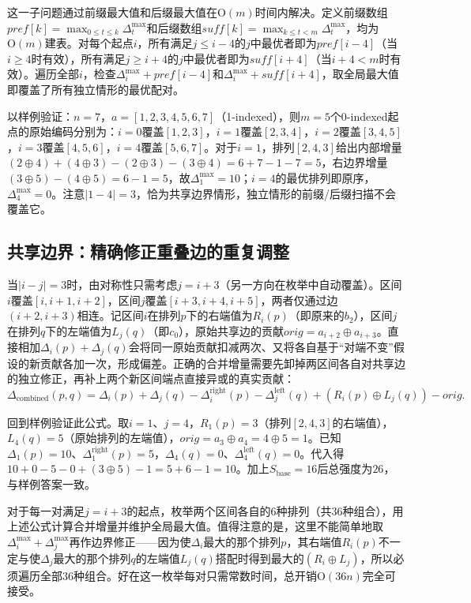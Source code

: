 这一子问题通过前缀最大值和后缀最大值在$\mathrm{O}(m)$时间内解决。定义前缀数组$\mathit{pref}[k]=\max_{0\le t\le k}\Delta_t^{\max}$和后缀数组$\mathit{suff}[k]=\max_{k\le t<m}\Delta_t^{\max}$，均为$\mathrm{O}(m)$建表。对每个起点$i$，所有满足$j\le i-4$的$j$中最优者即为$\mathit{pref}[i-4]$（当$i\ge4$时有效），所有满足$j\ge i+4$的$j$中最优者即为$\mathit{suff}[i+4]$（当$i+4<m$时有效）。遍历全部$i$，检查$\Delta_i^{\max}+\mathit{pref}[i-4]$和$\Delta_i^{\max}+\mathit{suff}[i+4]$，取全局最大值即覆盖了所有独立情形的最优配对。

以样例验证：$n=7$，$a=[1,2,3,4,5,6,7]$（1-indexed），则$m=5$个0-indexed起点的原始编码分别为：$i=0$覆盖$[1,2,3]$，$i=1$覆盖$[2,3,4]$，$i=2$覆盖$[3,4,5]$，$i=3$覆盖$[4,5,6]$，$i=4$覆盖$[5,6,7]$。对于$i=1$，排列$[2,4,3]$给出内部增量$(2\oplus4)+(4\oplus3)-(2\oplus3)-(3\oplus4)=6+7-1-7=5$，右边界增量$(3\oplus5)-(4\oplus5)=6-1=5$，故$\Delta_1^{\max}=10$；$i=4$的最优排列即原序，$\Delta_4^{\max}=0$。注意$|1-4|=3$，恰为共享边界情形，独立情形的前缀/后缀扫描不会覆盖它。

\subsection{共享边界：精确修正重叠边的重复调整}

当$|i-j|=3$时，由对称性只需考虑$j=i+3$（另一方向在枚举中自动覆盖）。区间$i$覆盖$[i,i+1,i+2]$，区间$j$覆盖$[i+3,i+4,i+5]$，两者仅通过边$(i+2,i+3)$相连。记区间$i$在排列$p$下的右端值为$R_i(p)$（即原来的$b_2$），区间$j$在排列$q$下的左端值为$L_j(q)$（即$c_0$），原始共享边的贡献$\mathit{orig}=a_{i+2}\oplus a_{i+3}$。直接相加$\Delta_i(p)+\Delta_j(q)$会将同一原始贡献扣减两次、又将各自基于“对端不变”假设的新贡献各加一次，形成偏差。正确的合并增量需要先卸掉两区间各自对共享边的独立修正，再补上两个新区间端点直接异或的真实贡献：
\[
\Delta_{\text{combined}}(p,q)=\Delta_i(p)+\Delta_j(q)-\Delta_i^{\text{right}}(p)-\Delta_j^{\text{left}}(q)+(R_i(p)\oplus L_j(q))-\mathit{orig}.
\]

回到样例验证此公式。取$i=1$、$j=4$，$R_1(p)=3$（排列$[2,4,3]$的右端值），$L_4(q)=5$（原始排列的左端值），$\mathit{orig}=a_3\oplus a_4=4\oplus5=1$。已知$\Delta_1(p)=10$、$\Delta_1^{\text{right}}(p)=5$，$\Delta_4(q)=0$、$\Delta_4^{\text{left}}(q)=0$。代入得$10+0-5-0+(3\oplus5)-1=5+6-1=10$。加上$S_{\text{base}}=16$后总强度为$26$，与样例答案一致。

对于每一对满足$j=i+3$的起点，枚举两个区间各自的$6$种排列（共$36$种组合），用上述公式计算合并增量并维护全局最大值。值得注意的是，这里不能简单地取$\Delta_i^{\max}+\Delta_j^{\max}$再作边界修正——因为使$\Delta_i$最大的那个排列$p$，其右端值$R_i(p)$不一定与使$\Delta_j$最大的那个排列$q$的左端值$L_j(q)$搭配时得到最大的$(R_i\oplus L_j)$，所以必须遍历全部$36$种组合。好在这一枚举每对只需常数时间，总开销$\mathrm{O}(36n)$完全可接受。

